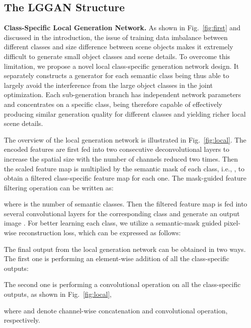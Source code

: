 \documentclass[10pt,twocolumn,letterpaper]{article}
\begin{document}
\subsection{The LGGAN Structure}
\par\noindent\textbf{Class-Specific Local Generation Network.}
As shown in Fig.~\ref{fig:first} and discussed in the introduction, the issue of training data imbalance between different classes and size difference between scene objects makes it extremely difficult to generate small object classes and scene details. 
To overcome this limitation, we propose a novel local class-specific generation network design. It separately constructs a generator for each semantic class being thus able to largely avoid the interference from the large object classes in the joint optimization. 
Each sub-generation branch has independent network parameters and concentrates on a specific class, being therefore capable of effectively producing similar generation quality for different classes and yielding richer local scene details. 
\par The overview of the local generation network  is illustrated in Fig.~\ref{fig:local}. The encoded features  are first fed into two consecutive deconvolutional layers to increase the spatial size  with the number of channels reduced two times. Then the scaled feature map  is multiplied by the semantic mask of each class, i.e., , to obtain a filtered class-specific feature map for each one. The mask-guided feature filtering operation can be written as: 

where  is the number of semantic classes. 
Then the filtered feature map  is fed into several convolutional layers for the corresponding  class and generate an output image . For better learning each class, we utilize a semantic-mask guided pixel-wise  reconstruction loss, which can be expressed as follows:

The final output  from the local generation network can be obtained in two ways. 
The first one is performing an element-wise addition of all the class-specific outputs:

The second one is performing a convolutional operation on all the class-specific outputs, as shown in Fig.~\ref{fig:local},

where  and  denote channel-wise concatenation and convolutional operation, respectively.
\end{document}
